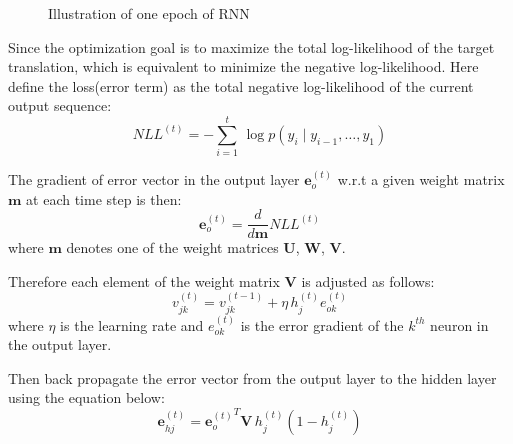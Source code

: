 \documentclass[11pt,letterpaper]{article}
\begin{document}
\begin{figure}[H]
	\begin{center}
	\end{center}
	\caption{Illustration of one epoch of RNN}
\end{figure}

Since the optimization goal is to maximize the total log-likelihood of the target translation, which is equivalent to minimize the negative log-likelihood. Here define the loss(error term) as the total negative log-likelihood of the current output sequence:
\begin{equation}
\textit{NLL}^{(t)} = -\sum\limits_{i=1}^t \, \log p(y_i\mid y_{i-1}, \dotsc , y_1)
\end{equation}

The gradient of error vector in the output layer $\mathbf{e}_o^{(t)} $ w.r.t a given weight matrix $\mathbf{m}$ at each time step is then:
\begin{equation}
\mathbf{e}_o^{(t)}  = \frac{d}{d \mathbf{m}} \textit{NLL}^{(t)}
\end{equation}
where $\mathbf{m}$ denotes one of the weight matrices $\mathbf{U}$, $\mathbf{W}$, $\mathbf{V}$.

Therefore each element of the weight matrix $\mathbf{V}$ is adjusted as follows:
\begin{equation}
v_{jk}^{(t)} = v_{jk}^{(t-1)}  + \eta\, h_j ^{(t)} e_{ok}^{(t)}
\end{equation}
where $\eta$ is the learning rate and $e_{ok}^{(t)}$ is the error gradient of the $k^{th}$ neuron in the output layer.

Then back propagate the error vector from the output layer to the hidden layer using the equation below:
\begin{equation}
\mathbf{e}_{hj}^{(t)} = {\mathbf{e}_o^{(t)}}^T \mathbf{V}\, h_j^{(t)} (1- h_j^{(t)})
\end{equation}
\end{document}
